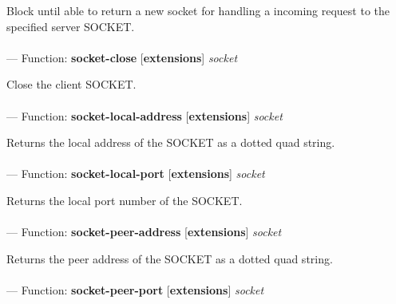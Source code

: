 \begin{adjustwidth}{5em}{5em}
Block until able to return a new socket for handling a incoming request to the specified server SOCKET.
\end{adjustwidth}

\paragraph{}
\label{EXTENSIONS:SOCKET-CLOSE}
--- Function: \textbf{socket-close} [\textbf{extensions}] \textit{socket}

\begin{adjustwidth}{5em}{5em}
Close the client SOCKET.
\end{adjustwidth}

\paragraph{}
\label{EXTENSIONS:SOCKET-LOCAL-ADDRESS}
--- Function: \textbf{socket-local-address} [\textbf{extensions}] \textit{socket}

\begin{adjustwidth}{5em}{5em}
Returns the local address of the SOCKET as a dotted quad string.
\end{adjustwidth}

\paragraph{}
\label{EXTENSIONS:SOCKET-LOCAL-PORT}
--- Function: \textbf{socket-local-port} [\textbf{extensions}] \textit{socket}

\begin{adjustwidth}{5em}{5em}
Returns the local port number of the SOCKET.
\end{adjustwidth}

\paragraph{}
\label{EXTENSIONS:SOCKET-PEER-ADDRESS}
--- Function: \textbf{socket-peer-address} [\textbf{extensions}] \textit{socket}

\begin{adjustwidth}{5em}{5em}
Returns the peer address of the SOCKET as a dotted quad string.
\end{adjustwidth}

\paragraph{}
\label{EXTENSIONS:SOCKET-PEER-PORT}
--- Function: \textbf{socket-peer-port} [\textbf{extensions}] \textit{socket}

